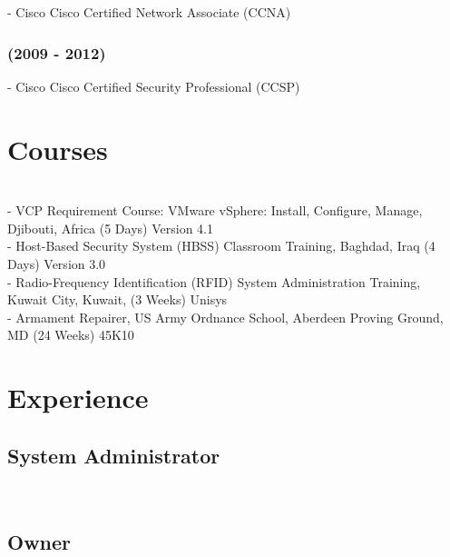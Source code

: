 \documentclass{article}
\begin{document}
{ - Cisco Cisco Certified Network Associate (CCNA) } 


{\noindent}\subsubsection { {(2009 - 2012)} }

{ - Cisco Cisco Certified Security Professional (CCSP) } 


\section {Courses}\\- { VCP Requirement Course: VMware vSphere: Install, Configure, Manage, Djibouti, Africa (5 Days) Version 4.1 }\\- { Host-Based Security System (HBSS) Classroom Training, Baghdad, Iraq (4 Days) Version 3.0 }\\- { Radio-Frequency Identification (RFID) System Administration Training, Kuwait City, Kuwait, (3 Weeks) Unisys }\\- { Armament Repairer, US Army Ordnance School, Aberdeen Proving Ground, MD (24 Weeks) 45K10 }\section {Experience}

\subsection { System Administrator }

{\noindent}
\\\subsection { Owner }
\end{document}
